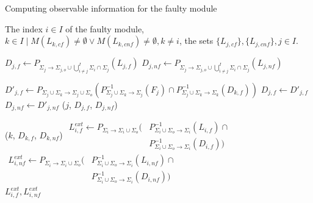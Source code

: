 \documentclass[a4paper, 10pt, conference]{ieeeconf}
\begin{document}
\begin{algorithm} 
\caption{Computing observable information for the faulty module} 
\begin{algorithmic}[1]
	\Require The index  $i \in I$ of the faulty module, 
	$k \in I \mid M(L_{k,cf}) \neq \emptyset \lor M(L_{k,cnf}) \neq
	\emptyset, k \neq i$, the sets $\{L_{j,cf}\}, \{L_{j,cnf}\}, j \in I$.

	\label{alg:fco_init}
		\State $D_{j,f} \leftarrow
			P_{\Sigma_j \rightarrow \Sigma_{j,o} \cup 
			\bigcup_{i\neq j}^I \Sigma_i\cap \Sigma_j}(L_{j,f})$
		\State $D_{j,nf} \leftarrow
			P_{\Sigma_j \rightarrow \Sigma_{j,o} \cup 
			\bigcup_{i\neq j}^I \Sigma_i\cap \Sigma_j}(L_{j,nf})$
	\EndFor
	
			\State $D'_{j,f} \leftarrow 
			P_{\Sigma_j \cup \Sigma_k \rightarrow \Sigma_j \cup \Sigma_o}
			(P_{\Sigma_j \cup \Sigma_k \rightarrow \Sigma_j}^{-1}(F_j) 
			\cap 
			P_{\Sigma_j \cup \Sigma_k \rightarrow \Sigma_k}^{-1}(D_{k,f}))$
				\State $D_{j,f}\leftarrow D'_{j,f}$
				\State $D_{j,nf}\leftarrow D'_{j,nf}$
				\State {}($j$, $D_{j,f}$, $D_{j,nf}$)
			\EndIf
		\EndFor 
	\EndProcedure
	
	\State {}($k$, $D_{k,f}$, $D_{k,nf}$)
	\label{alg:fco_enter_recursion}
	\State$
	\label{alg:fco_finalize}
	\begin{array}{ll}
	L_{i,f}^{ext} \leftarrow 
	P_{\Sigma_i \rightarrow \Sigma_i \cup \Sigma_o} ( &  
	P_{\Sigma_i \cup \Sigma_o \rightarrow \Sigma_i}^{-1}(L_{i,f}) \cap \\ 
	& 
	P_{\Sigma_i \cup \Sigma_o \rightarrow \Sigma_i}^{-1}(D_{i,f}))
	\end{array}
	$
	\State$
	\begin{array}{ll}
	L_{i,nf}^{ext} \leftarrow 
	P_{\Sigma_i \rightarrow \Sigma_i \cup \Sigma_o} ( &  
	P_{\Sigma_i \cup \Sigma_o \rightarrow \Sigma_i}^{-1}(L_{i,nf}) \cap \\ 
	& 
	P_{\Sigma_i \cup \Sigma_o \rightarrow \Sigma_i}^{-1}(D_{i,nf}))
	\end{array}
	$
	\\
	\Return $L_{i,f}^{ext}, L_{i,nf}^{ext}$
\end{algorithmic}
\label{alg:propagate-d}
\end{algorithm}
\end{document}
